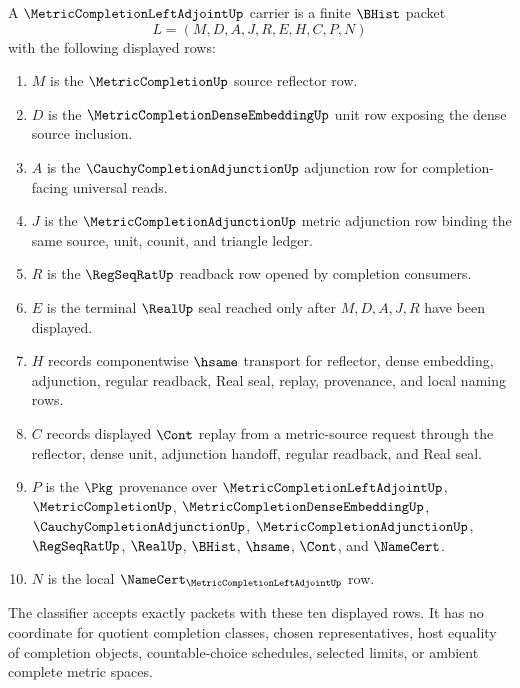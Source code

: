 \begin{definition}
\label{def:metric-completion-left-adjoint-carrier}
A $\MetricCompletionLeftAdjointUp$ carrier is a finite $\BHist$ packet
$$
L=(M,D,A,J,R,E,H,C,P,N)
$$
with the following displayed rows:
\begin{enumerate}
\item $M$ is the $\MetricCompletionUp$ source reflector row.
\item $D$ is the $\MetricCompletionDenseEmbeddingUp$ unit row exposing the dense source inclusion.
\item $A$ is the $\CauchyCompletionAdjunctionUp$ adjunction row for completion-facing universal reads.
\item $J$ is the $\MetricCompletionAdjunctionUp$ metric adjunction row binding the same source, unit, counit, and triangle ledger.
\item $R$ is the $\RegSeqRatUp$ readback row opened by completion consumers.
\item $E$ is the terminal $\RealUp$ seal reached only after $M,D,A,J,R$ have been displayed.
\item $H$ records componentwise $\hsame$ transport for reflector, dense embedding, adjunction, regular readback, Real seal, replay, provenance, and local naming rows.
\item $C$ records displayed $\Cont$ replay from a metric-source request through the reflector, dense unit, adjunction handoff, regular readback, and Real seal.
\item $P$ is the $\Pkg$ provenance over $\MetricCompletionLeftAdjointUp$, $\MetricCompletionUp$, $\MetricCompletionDenseEmbeddingUp$, $\CauchyCompletionAdjunctionUp$, $\MetricCompletionAdjunctionUp$, $\RegSeqRatUp$, $\RealUp$, $\BHist$, $\hsame$, $\Cont$, and $\NameCert$.
\item $N$ is the local $\NameCert_{\MetricCompletionLeftAdjointUp}$ row.
\end{enumerate}
The classifier accepts exactly packets with these ten displayed rows. It has no coordinate for quotient completion classes, chosen representatives, host equality of completion objects, countable-choice schedules, selected limits, or ambient complete metric spaces.
\end{definition}

